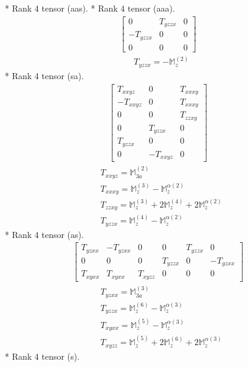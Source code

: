 \documentclass[fleqn,8pt,landscape]{jsarticle}
\begin{document}
* Rank 4 tensor (aas).
* Rank 4 tensor (aaa).
\begin{align*}
\begin{bmatrix} 0 & T_{yzzx} & 0 \\ - T_{yzzx} & 0 & 0 \\ 0 & 0 & 0 \end{bmatrix}
\end{align*}
\begin{align*}
& T_{yzzx} = - \mathbb{M}_{z}^{(2)}
\end{align*}
* Rank 4 tensor (sa).
\begin{align*}
\begin{bmatrix} T_{xxyz} & 0 & T_{xxxy} \\ - T_{xxyz} & 0 & T_{xxxy} \\ 0 & 0 & T_{zzxy} \\ 0 & T_{yzzx} & 0 \\ T_{yzzx} & 0 & 0 \\ 0 & - T_{xxyz} & 0 \end{bmatrix}
\end{align*}
\begin{align*}
& T_{xxyz} = \mathbb{M}_{3a}^{(2)} \\
& T_{xxxy} = \mathbb{M}_{z}^{(3)} - \mathbb{M}_{z}^{\alpha(2)} \\
& T_{zzxy} = \mathbb{M}_{z}^{(3)} + 2 \mathbb{M}_{z}^{(4)} + 2 \mathbb{M}_{z}^{\alpha(2)} \\
& T_{yzzx} = \mathbb{M}_{z}^{(4)} - \mathbb{M}_{z}^{\alpha(2)}
\end{align*}
* Rank 4 tensor (as).
\begin{align*}
\begin{bmatrix} T_{yzxx} & - T_{yzxx} & 0 & 0 & T_{yzzx} & 0 \\ 0 & 0 & 0 & T_{yzzx} & 0 & - T_{yzxx} \\ T_{xyxx} & T_{xyxx} & T_{xyzz} & 0 & 0 & 0 \end{bmatrix}
\end{align*}
\begin{align*}
& T_{yzxx} = \mathbb{M}_{3a}^{(3)} \\
& T_{yzzx} = \mathbb{M}_{z}^{(6)} - \mathbb{M}_{z}^{\alpha(3)} \\
& T_{xyxx} = \mathbb{M}_{z}^{(5)} - \mathbb{M}_{z}^{\alpha(3)} \\
& T_{xyzz} = \mathbb{M}_{z}^{(5)} + 2 \mathbb{M}_{z}^{(6)} + 2 \mathbb{M}_{z}^{\alpha(3)}
\end{align*}
* Rank 4 tensor (s).
\end{document}
